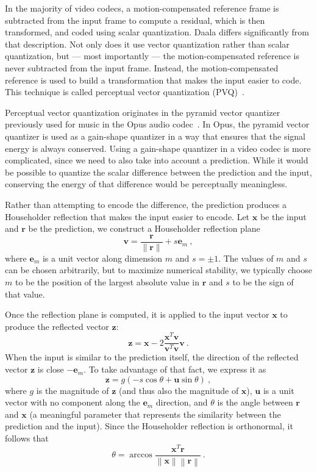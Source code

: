 \documentclass[english,conference,10pt]{IEEEtran}
\begin{document}
In the majority of video codecs, a motion-compensated reference frame
is subtracted from the input frame to compute a residual, which is
then transformed, and coded using scalar quantization. Daala differs
significantly from that description. Not only does it use vector quantization
rather than scalar quantization, but --- most importantly --- the motion-compensated
reference is never subtracted from the input frame. Instead,
the motion-compensated reference is used to build a transformation
that makes the input easier to code. This technique is called perceptual
vector quantization (PVQ)~\cite{valin2015spie}.

Perceptual vector quantization originates in the pyramid vector quantizer
previously used for music in the Opus audio codec~\cite{ValinAES}. In Opus,
the pyramid vector quantizer is used as a gain-shape quantizer in a way that
ensures that the signal energy is always conserved. Using a gain-shape
quantizer in a video codec is more complicated, since we need to also take
into account a prediction. While it would be possible to quantize the
scalar difference
between the prediction and the input, conserving the energy of that
difference would be perceptually meaningless.

Rather than attempting to encode the difference, the prediction produces
a Householder reflection that makes the input easier to encode. Let
$\mathbf{x}$ be the input and $\mathbf{r}$ be the prediction, we construct
 a Householder reflection plane
\begin{equation}
\mathbf{v} = \frac{\mathbf{r}}{\|\mathbf{r}\|} + s\mathbf{e}_m\ ,
\end{equation}
where $\mathbf{e}_m$ is a unit vector along dimension $m$ and $s = \pm1$.
The values of $m$ and $s$ can be chosen arbitrarily, but to maximize
numerical stability, we typically choose $m$ to be the position of the
largest absolute value in $\mathbf{r}$ and $s$ to be the sign of that value.

Once the reflection plane is computed, it is applied to the input vector
$\mathbf{x}$ to produce the reflected vector $\mathbf{z}$:
\begin{equation}
\mathbf{z} = \mathbf{x} - 2\frac{\mathbf{x}^T\mathbf{v}}
{\mathbf{v}^T\mathbf{v}}\mathbf{v}\ .
\end{equation}
When the input is similar to the prediction itself, the direction of the
reflected vector $\mathbf{z}$ is close $-\mathbf{e}_m$. To take advantage of
that fact, we express it as
\begin{equation}
\mathbf{z} = g\left(-s\cos\theta + \mathbf{u}\sin\theta\right)\ ,
\end{equation}
where $g$ is the magnitude of $\mathbf{z}$ (and thus also the magnitude of
$\mathbf{x}$), $\mathbf{u}$ is a unit vector with no component along the
$\mathbf{e}_m$ direction, and $\theta$ is the angle between $\mathbf{r}$ and
$\mathbf{x}$ (a meaningful parameter that represents the similarity between
the prediction and the input). Since the Householder reflection is orthonormal,
it follows that
\begin{equation}
\theta = \arccos\frac{\mathbf{x}^T\mathbf{r}}
                   {\left\|\mathbf{x}\right\|\left\|\mathbf{r}\right\|}\ .
\end{equation}
\end{document}
